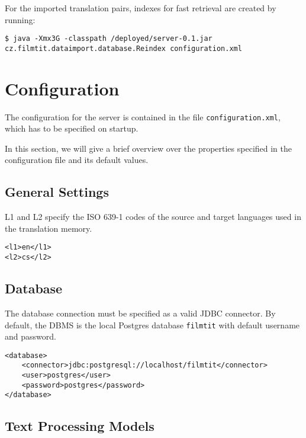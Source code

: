 For the imported translation pairs, indexes for fast retrieval are created by running:

\vspace*{0.5em}
\begin{lstlisting}
$ java -Xmx3G -classpath /deployed/server-0.1.jar cz.filmtit.dataimport.database.Reindex configuration.xml
\end{lstlisting}
\vspace*{0.5em}




\section{Configuration}
\label{sec:config}

The configuration for the server is contained in the file \verb#configuration.xml#, which has to be specified on startup.

In this section, we will give a brief overview over the properties specified in the configuration file and its default values.

\subsection{General Settings}
L1 and L2 specify the ISO 639-1 codes of the source and target languages used in the translation memory.
\begin{lstlisting}
<l1>en</l1>
<l2>cs</l2>
\end{lstlisting}

\subsection{Database}

The database connection must be specified as a valid JDBC connector. By default, the DBMS is the local Postgres database \verb#filmtit# with default username and password.

\begin{lstlisting}
<database>
    <connector>jdbc:postgresql://localhost/filmtit</connector>
    <user>postgres</user>
    <password>postgres</password>
</database>
\end{lstlisting}

\subsection{Text Processing Models}

